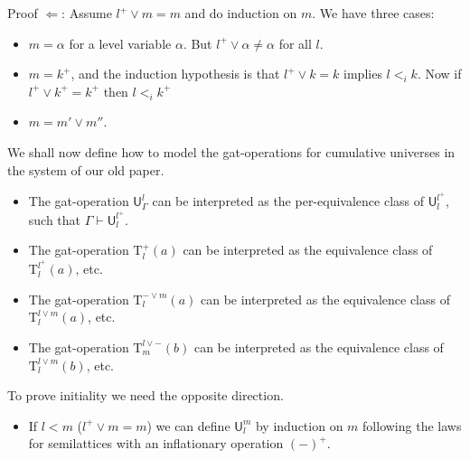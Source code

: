 \documentclass[11pt,a4paper]{article}
\theoremstyle{definition}
\newcommand{\UU}{\mathsf{U}}
\def\UU{\mathsf{U}}
\newcommand{\Ta}{\mathrm{T}}
\begin{document}
Proof $\Leftarrow$: Assume $l^+ \vee m = m$ and do induction on $m$. We have three cases:
\begin{itemize}
\item $m = \alpha$ for a level variable $\alpha$. But  $l^+ \vee \alpha \neq \alpha$ for all $l$.
\item $m = k^+$, and the induction hypothesis is that $l^+ \vee k = k$ implies $l <_i k$. Now if $l^+ \vee k^+ = k^+$ then $l <_i k^+$
\item $m = m' \vee m''$.
\end{itemize}

We shall now define how to model the gat-operations for cumulative universes in the system of our old paper.
\begin{itemize}
\item 
The gat-operation $\UU^l_\Gamma$ can be interpreted as the per-equivalence class of $\UU^{l^+}_l$, such that $\Gamma \vdash \UU^{l^+}_l$.
\item
The gat-operation $\Ta^+_l(a)$ can be interpreted as the equivalence class of $\Ta^{l^+}_l(a)$, etc.
\item
The gat-operation $\Ta^{-\vee m}_l(a)$ can be interpreted as the equivalence class of $\Ta^{l \vee m}_l(a)$, etc.
\item
The gat-operation $\Ta^{l\vee -}_m(b)$ can be interpreted as the equivalence class of $\Ta^{l \vee m}_l(b)$, etc.
\end{itemize}
To prove initiality we need the opposite direction.
\begin{itemize}
\item If $l < m$ ($l^+ \vee m = m$) we can define $\UU^m_l$ by induction on $m$ following the laws for semilattices with an inflationary operation $(-)^+$.
\end{itemize}











\end{document}
